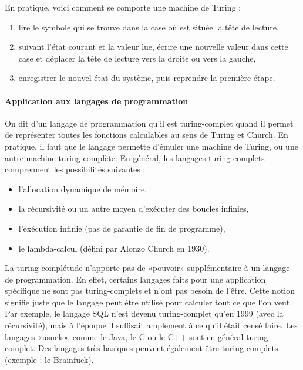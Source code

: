 En pratique, voici comment se comporte une machine de Turing \cite{bib_wiki_turing} \cite{bib_jdn} :
\begin{enumerate}
\item lire le symbole qui se trouve dans la case où est située la tête de lecture,
\item suivant l'état courant et la valeur lue, écrire une nouvelle valeur dans cette case et déplacer la tête de lecture vers la droite ou vers la gauche,
\item enregistrer le nouvel état du système, puis reprendre la première étape.
\end{enumerate}

\paragraph{Application aux langages de programmation}

On dit d'un langage de programmation qu'il est turing-complet quand il permet de représenter toutes les fonctions calculables au sens de Turing et Church. \cite{bib_w3support} \cite{bib_wiki_lambda} En pratique, il faut que le langage permette d'émuler une machine de Turing, ou une autre machine turing-complète. En général, les langages turing-complets comprennent les possibilités suivantes :
\begin{itemize}
\item l'allocation dynamique de mémoire,
\item la récursivité ou un autre moyen d'exécuter des boucles infinies,
\item l'exécution infinie (pas de garantie de fin de programme),
\item le lambda-calcul (défini par Alonzo Church en 1930).\\
\end{itemize}

La turing-complétude n'apporte pas de «pouvoir» supplémentaire à un langage de programmation. En effet, certains langages faits pour une application spécifique ne sont pas turing-complets et n'ont pas besoin de l'être. Cette notion signifie juste que le langage peut être utilisé pour calculer tout ce que l'on veut. Par exemple, le langage SQL n'est devenu turing-complet qu'en 1999 (avec la récursivité), mais à l'époque il suffisait amplement à ce qu'il était censé faire. Les langages «usuels», comme le Java, le C ou le C++ sont en général turing-complet. Des langages très basiques peuvent également être turing-complets (exemple : le Brainfuck). \cite{bib_brainfuck}\\

